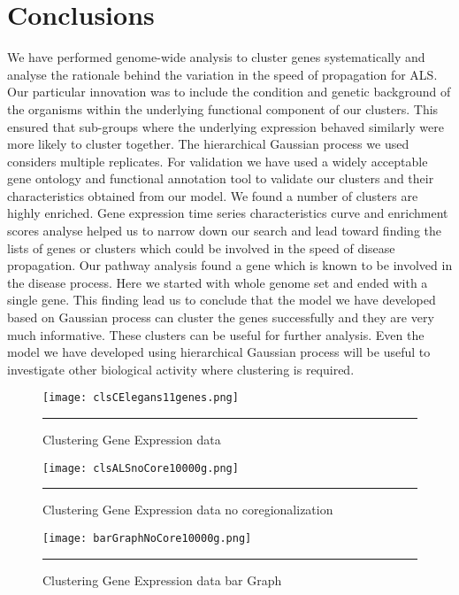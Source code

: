 \section{Conclusions}
We have performed genome-wide analysis to cluster genes systematically
and analyse the rationale behind the variation in the speed of
propagation for ALS. Our particular innovation was to include the
condition and genetic background of the organisms within the
underlying functional component of our clusters. This ensured that
sub-groups where the underlying expression behaved similarly were more
likely to cluster together. The hierarchical Gaussian process we used
considers multiple replicates. For validation we have used a widely
acceptable gene ontology and functional annotation tool to validate
our clusters and their characteristics obtained from our model. We
found a number of clusters are highly enriched. Gene expression time series
characteristics curve and enrichment scores analyse helped us to
narrow down our search and lead toward finding the lists of genes or
clusters which could be involved in the speed of disease
propagation. Our pathway analysis found a gene which is known to be
involved in the disease process. Here we started with whole genome set
and ended with a single gene. This finding lead us to conclude that
the model we have developed based on Gaussian process can cluster the
genes successfully and they are very much informative. These clusters
can be useful for further analysis.  Even the model we have developed
using hierarchical Gaussian process will be useful to investigate
other biological activity where clustering is required.


\begin{figure}
	\centering
		\texttt{[image: clsCElegans11genes.png]}
		\rule{35em}{0.5pt}
	\caption[Clustering Gene Expression data]
		{Clustering Gene Expression data}
	\label{fig:TFA_with_RBFnWhKernel}
\end{figure}


\begin{figure}
	\centering
		\texttt{[image: clsALSnoCore10000g.png]}
		\rule{35em}{0.5pt}
	\caption[Clustering Gene Expression data no coregionalization]
		{Clustering Gene Expression data no coregionalization}
	\label{fig:TFA_with_RBFnWhKernel}
\end{figure}


\begin{figure}
	\centering
		\texttt{[image: barGraphNoCore10000g.png]}
		\rule{35em}{0.5pt}
	\caption[Clustering Gene Expression data bar Graph]
		{Clustering Gene Expression data bar Graph}
	\label{fig:TFA_with_RBFnWhKernel}
\end{figure}